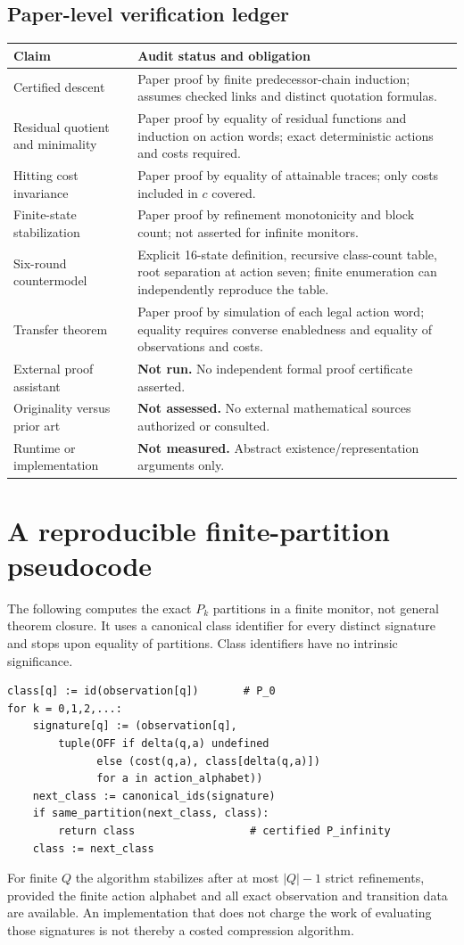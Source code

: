 \documentclass[11pt,letterpaper]{article}
\begin{document}
\subsection*{Paper-level verification ledger}
\begin{tabularx}{\textwidth}{@{}p{}X@{}}\toprule
Claim & Audit status and obligation\\\midrule
Certified descent & Paper proof by finite predecessor-chain induction; assumes checked links and distinct quotation formulas.\\
Residual quotient and minimality & Paper proof by equality of residual functions and induction on action words; exact deterministic actions and costs required.\\
Hitting cost invariance & Paper proof by equality of attainable traces; only costs included in $c$ covered.\\
Finite-state stabilization & Paper proof by refinement monotonicity and block count; not asserted for infinite monitors.\\
Six-round countermodel & Explicit 16-state definition, recursive class-count table, root separation at action seven; finite enumeration can independently reproduce the table.\\
Transfer theorem & Paper proof by simulation of each legal action word; equality requires converse enabledness and equality of observations and costs.\\
External proof assistant & \textbf{Not run.} No independent formal proof certificate asserted.\\
Originality versus prior art & \textbf{Not assessed.} No external mathematical sources authorized or consulted.\\
Runtime or implementation & \textbf{Not measured.} Abstract existence/representation arguments only.\\\bottomrule
\end{tabularx}

\section{A reproducible finite-partition pseudocode}
The following computes the exact $P_k$ partitions in a finite monitor, not general theorem closure. It uses a canonical class identifier for every distinct signature and stops upon equality of partitions. Class identifiers have no intrinsic significance.
\begin{verbatim}
class[q] := id(observation[q])       # P_0
for k = 0,1,2,...:
    signature[q] := (observation[q],
        tuple(OFF if delta(q,a) undefined
              else (cost(q,a), class[delta(q,a)])
              for a in action_alphabet))
    next_class := canonical_ids(signature)
    if same_partition(next_class, class):
        return class                  # certified P_infinity
    class := next_class
\end{verbatim}
For finite $Q$ the algorithm stabilizes after at most $|Q|-1$ strict refinements, provided the finite action alphabet and all exact observation and transition data are available. An implementation that does not charge the work of evaluating those signatures is not thereby a costed compression algorithm.
\end{document}
